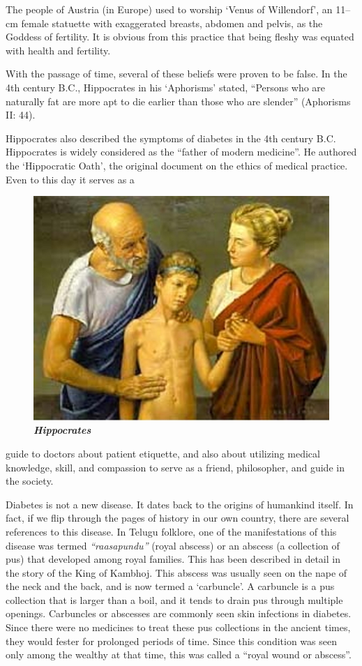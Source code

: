 The people of Austria (in Europe) used to worship ‘Venus of Willendorf’, an 11–cm female statuette with exaggerated breasts, abdomen and pelvis, as the Goddess of fertility. It is obvious from this practice that being fleshy was equated with health and fertility.


With the passage of time, several of these beliefs were proven to be false. In the 4th century B.C., Hippocrates in his ‘Aphorisms’ stated, “Persons who are naturally fat are more apt to die earlier than those who are slender” (Aphorisms II: 44).



Hippocrates also described the symp\-toms of diabetes in the 4th century B.C. Hippocrates is widely considered as the “father of modern medicine”. He autho\-red the ‘Hippocratic Oath’, the original document on the ethics of medical pra\-ctice. Even to this day it serves as a 
\begin{figure}
\centering
\includegraphics[scale=.9]{images/005.jpg}\\
\textbf{\textit{Hippocrates}}
\end{figure}
guide to doctors about patient etiquette, and also about utilizing medical know\-ledge, skill, and compassion to serve as a friend, philosopher, and guide in the society.



Diabetes is not a new disease. It dates back to the origins of humankind itself. In fact, if we flip through the pages of history in our own country, there are several refe\-rences to this disease. In Telugu folklore, one of the manifestations of this disease was termed \textit{“raasapundu”} (royal abscess) or an abscess (a collection of pus) that deve\-loped among royal families. This has been described in detail in the story of the King of Kambhoj. This abscess was usually seen on the nape of the neck and the back, and is now termed a  ‘carbuncle’. A carbuncle is a pus collection that is larger than a boil, and it tends to drain pus through multiple openings. Carbuncles or abscesses are commonly seen skin infections in diabetes. Since there were no medicines to treat these pus collections in the ancient times, they would fester for prolonged periods of time. Since this condition was seen only among the wealthy at that time, this was called a “royal wound or abscess”.

